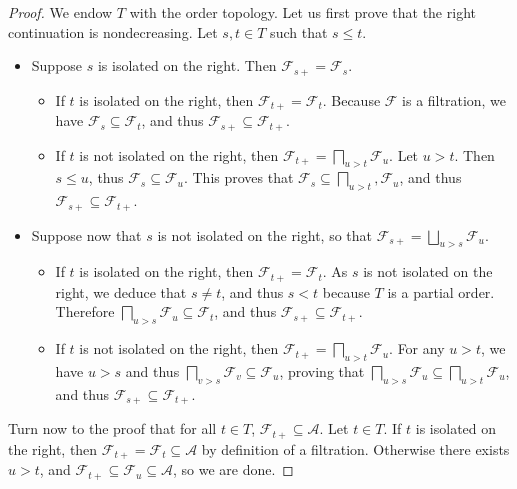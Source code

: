 \begin{proof}\leanok
We endow $T$ with the order topology. Let us first prove that the right continuation is nondecreasing. Let $s, t \in T$ such that $s \le t$.
\begin{itemize}
  \item Suppose $s$ is isolated on the right. Then $\mathcal{F}_{s+} = \mathcal{F}_s$.
  \begin{itemize}
    \item If $t$ is isolated on the right, then $\mathcal{F}_{t+} = \mathcal{F}_t$. Because $\mathcal{F}$ is a filtration, we have $\mathcal{F}_s \subseteq \mathcal{F}_t$, and thus $\mathcal{F}_{s+} \subseteq \mathcal{F}_{t+}$.
    \item If $t$ is not isolated on the right, then $\mathcal{F}_{t+} = \bigsqcap_{u > t} \mathcal{F}_{u}$. Let $u > t$. Then $s \le u$, thus $\mathcal{F}_s \subseteq \mathcal{F}_u$. This proves that $\mathcal{F}_s \subseteq \bigsqcap_{u > t}, \mathcal{F}_u$, and thus $\mathcal{F}_{s+} \subseteq \mathcal{F}_{t+}$.
  \end{itemize}
  \item Suppose now that $s$ is not isolated on the right, so that $\mathcal{F}_{s+} = \bigsqcup_{u > s} \mathcal{F}_u$.
  \begin{itemize}
    \item If $t$ is isolated on the right, then $\mathcal{F}_{t+} = \mathcal{F}_t$. As $s$ is not isolated on the right, we deduce that $s \ne t$, and thus $s < t$ because $T$ is a partial order. Therefore $\bigsqcap_{u > s} \mathcal{F}_u \subseteq \mathcal{F}_t$, and thus $\mathcal{F}_{s+} \subseteq \mathcal{F}_{t+}$.
    \item If $t$ is not isolated on the right, then $\mathcal{F}_{t+} = \bigsqcap_{u > t} \mathcal{F}_u$. For any $u > t$, we have $u > s$ and thus $\bigsqcap_{v > s} \mathcal{F}_v \subseteq \mathcal{F}_u$, proving that $\bigsqcap_{u > s} \mathcal{F}_u \subseteq \bigsqcap_{u > t} \mathcal{F}_u$, and thus $\mathcal{F}_{s+} \subseteq \mathcal{F}_{t+}$.
  \end{itemize}
\end{itemize}

Turn now to the proof that for all $t \in T$, $\mathcal{F}_{t+} \subseteq \mathcal{A}$. Let $t \in T$. If $t$ is isolated on the right, then $\mathcal{F}_{t+} = \mathcal{F}_t \subseteq \mathcal{A}$ by definition of a filtration. Otherwise there exists $u > t$, and $\mathcal{F}_{t+} \subseteq \mathcal{F}_u \subseteq \mathcal{A}$, so we are done.
\end{proof}

